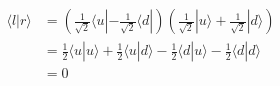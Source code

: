 


\bigskip
\begin{align*}
\langle l|r\rangle&=\left(\frac{1}{\sqrt2}\langle u|-\frac{1}{\sqrt2}\langle d|\right)
\left(\frac{1}{\sqrt2}|u\rangle+\frac{1}{\sqrt2}|d\rangle\right)
\\[1ex]
&=\frac{1}{2}\langle u|u\rangle+\frac{1}{2}\langle u|d\rangle
-\frac{1}{2}\langle d|u\rangle-\frac{1}{2}\langle d|d\rangle
\\[1ex]
&=0
\end{align*}


